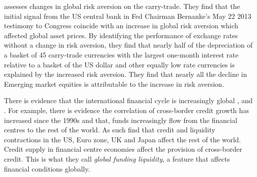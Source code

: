 \documentclass[12pt, a4paper, oneside]{article} %
\begin{document}
 
\citet{NYFedtaper} assesses changes in global risk aversion on the carry-trade.  They find that the initial signal from the US central bank in Fed Chairman Bernanke's May 22 2013 testimony to Congress coincide with an increase in global risk aversion which affected global asset prices. %
By identifying the performance of exchange rates without a change in risk aversion, they find that nearly half of the depreciation of a basket of 45 carry-trade currencies with the largest one-month interest rate relative to a basket of the US dollar and other equally low rate currencies is explained by the increased risk aversion. They find that nearly all the decline in Emerging market equities is attributable to the increase in risk aversion.

There is evidence that the international financial cycle is increasingly global \citet{Rey2013}, \citet{Obstfeld2014} and \citet{Bruno2014}.  %
For example, there is evidence the correlation of cross-border credit growth has increased since the 1990s and that, funds increasingly flow from the financial centres to the rest of the world. As such \citet{Cerutti2014} find that credit and liquidity contractions in  the US, Euro zone, UK and Japan affect the rest of the world. Credit supply in financial centre economies affect the provision of cross-border credit.  This is what they call \emph{global funding liquidity}, a feature that affects financial conditions globally. 



\end{document}
